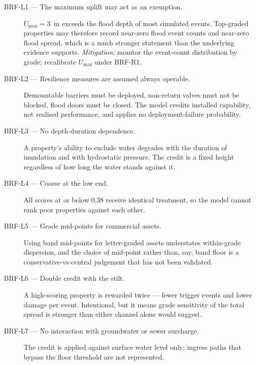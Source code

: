\documentclass[11pt,a4paper]{article}
\begin{document}
\mkmlimitations
\label{sec:limitations}

\begin{description}
  \item[BRF-L1 --- The maximum uplift may act as an exemption.] $U_{\max}=3$~m
        exceeds the flood depth of most simulated events. Top-graded properties
        may therefore record near-zero flood event counts and near-zero flood
        spread, which is a much stronger statement than the underlying evidence
        supports. \emph{Mitigation:} monitor the event-count distribution by
        grade; recalibrate $U_{\max}$ under BRF-R1.
  \item[BRF-L2 --- Resilience measures are assumed always operable.] Demountable
        barriers must be deployed, non-return valves must not be blocked, flood
        doors must be closed. The model credits installed capability, not
        realised performance, and applies no deployment-failure probability.
  \item[BRF-L3 --- No depth-duration dependence.] A property's ability to
        exclude water degrades with the duration of inundation and with
        hydrostatic pressure. The credit is a fixed height regardless of how
        long the water stands against it.
  \item[BRF-L4 --- Coarse at the low end.] All scores at or below 0.38 receive
        identical treatment, so the model cannot rank poor properties against
        each other.
  \item[BRF-L5 --- Grade mid-points for commercial assets.] Using band
        mid-points for letter-graded assets understates within-grade dispersion,
        and the choice of mid-point rather than, say, band floor is a
        conservative-vs-central judgement that has not been validated.
  \item[BRF-L6 --- Double credit with the stilt.] A high-scoring property is
        rewarded twice --- fewer trigger events and lower damage per event.
        Intentional, but it means grade sensitivity of the total spread is
        stronger than either channel alone would suggest.
  \item[BRF-L7 --- No interaction with groundwater or sewer surcharge.] The
        credit is applied against surface water level only; ingress paths that
        bypass the floor threshold are not represented.
\end{description}
\end{document}
